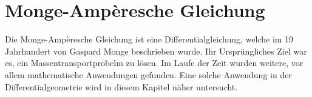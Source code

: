 %
%
%
%
\chapter{Monge-Ampèresche Gleichung\label{chapter:mongeampere}}
\begin{refsection}

Die Monge-Ampèresche Gleichung ist eine Differentialgleichung, welche
im 19 Jahrhundert von Gaspard Monge beschrieben wurde. 
Ihr Ursprüngliches Ziel war es, ein Massentransportprobelm zu lösen. 
Im Laufe der Zeit wurden weitere, vor allem mathematische Anwendungen
gefunden.
Eine solche Anwendung in der Differentialgeometrie wird in diesem Kapitel näher 
untersucht.






\printbibliography[heading=subbibliography]
\end{refsection}
